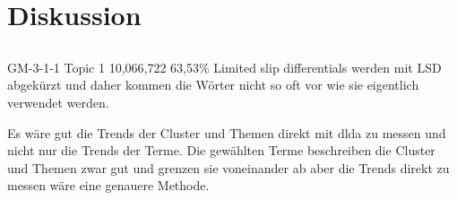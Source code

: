 \chapter{Diskussion}

\section{}
GM-3-1-1
Topic 1 
10,066,722	63,53\%
Limited slip differentials werden mit LSD abgekürzt und daher kommen die Wörter nicht so oft vor wie sie eigentlich verwendet werden.


Es wäre gut die Trends der Cluster und Themen direkt mit \gls{dlda} zu messen und nicht nur die Trends der Terme. Die gewählten Terme beschreiben die Cluster und Themen zwar gut und grenzen sie voneinander ab aber die Trends direkt zu messen wäre eine genauere Methode.